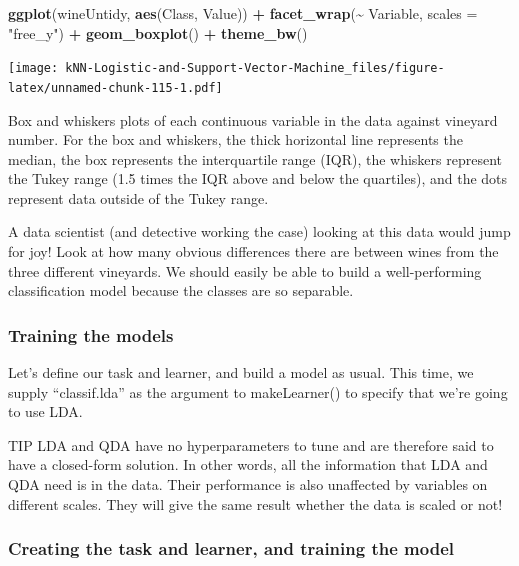 \documentclass[
]{article}
\newenvironment{Shaded}{\begin{snugshade}}{\end{snugshade}}
\newcommand{\AttributeTok}[1]{\textcolor[rgb]{0.13,0.29,0.53}{#1}}
\newcommand{\FunctionTok}[1]{\textcolor[rgb]{0.13,0.29,0.53}{\textbf{#1}}}
\newcommand{\NormalTok}[1]{#1}
\newcommand{\SpecialCharTok}[1]{\textcolor[rgb]{0.81,0.36,0.00}{\textbf{#1}}}
\newcommand{\StringTok}[1]{\textcolor[rgb]{0.31,0.60,0.02}{#1}}
\begin{document}
\begin{Shaded}
\begin{Highlighting}[]
\FunctionTok{ggplot}\NormalTok{(wineUntidy, }\FunctionTok{aes}\NormalTok{(Class, Value)) }\SpecialCharTok{+}
\FunctionTok{facet\_wrap}\NormalTok{(}\SpecialCharTok{\textasciitilde{}}\NormalTok{ Variable, }\AttributeTok{scales =} \StringTok{"free\_y"}\NormalTok{) }\SpecialCharTok{+}
\FunctionTok{geom\_boxplot}\NormalTok{() }\SpecialCharTok{+}
\FunctionTok{theme\_bw}\NormalTok{()}
\end{Highlighting}
\end{Shaded}

\texttt{[image: kNN-Logistic-and-Support-Vector-Machine\_files/figure-latex/unnamed-chunk-115-1.pdf]}

Box and whiskers plots of each continuous variable in the data against
vineyard number. For the box and whiskers, the thick horizontal line
represents the median, the box represents the interquartile range (IQR),
the whiskers represent the Tukey range (1.5 times the IQR above and
below the quartiles), and the dots represent data outside of the Tukey
range.

A data scientist (and detective working the case) looking at this data
would jump for joy! Look at how many obvious differences there are
between wines from the three different vineyards. We should easily be
able to build a well-performing classification model because the classes
are so separable.

\subsubsection{Training the models}\label{training-the-models}

Let's define our task and learner, and build a model as usual. This
time, we supply ``classif.lda'' as the argument to makeLearner() to
specify that we're going to use LDA.

TIP LDA and QDA have no hyperparameters to tune and are therefore said
to have a closed-form solution. In other words, all the information that
LDA and QDA need is in the data. Their performance is also unaffected by
variables on different scales. They will give the same result whether
the data is scaled or not!

\subsubsection{Creating the task and learner, and training the
model}\label{creating-the-task-and-learner-and-training-the-model}
\end{document}
